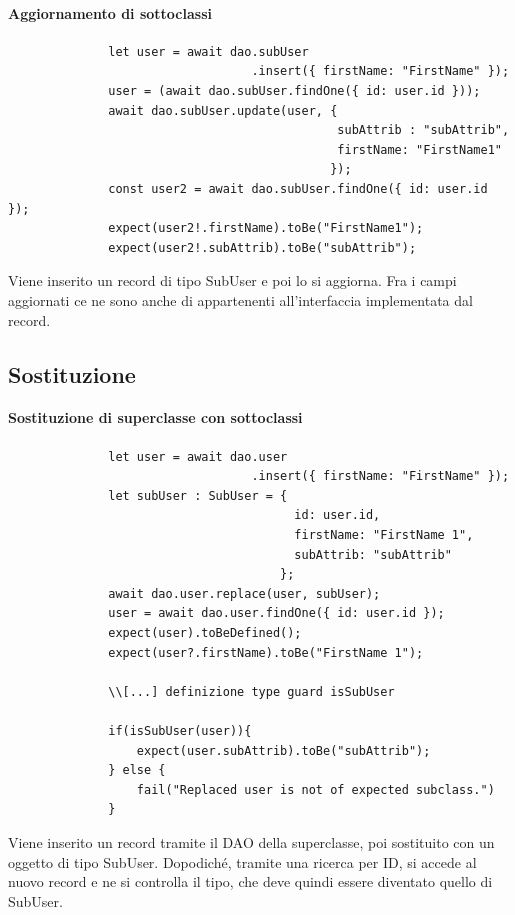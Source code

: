 \documentclass[a4paper, 12pt]{report}
\begin{document}
          \paragraph{Aggiornamento di sottoclassi}
            \begin{Verbatim}
              let user = await dao.subUser
                                  .insert({ firstName: "FirstName" });
              user = (await dao.subUser.findOne({ id: user.id }));
              await dao.subUser.update(user, { 
                                              subAttrib : "subAttrib",
                                              firstName: "FirstName1"
                                             });
              const user2 = await dao.subUser.findOne({ id: user.id });
              expect(user2!.firstName).toBe("FirstName1");
              expect(user2!.subAttrib).toBe("subAttrib");
            \end{Verbatim}
            Viene inserito un record di tipo SubUser e poi lo si aggiorna.
            Fra i campi aggiornati ce ne sono anche di appartenenti all'interfaccia implementata dal record.
        \subsection{Sostituzione}
          \paragraph{Sostituzione di superclasse con sottoclassi}
            \begin{Verbatim}
              let user = await dao.user
                                  .insert({ firstName: "FirstName" });
              let subUser : SubUser = { 
                                        id: user.id,
                                        firstName: "FirstName 1",
                                        subAttrib: "subAttrib"
                                      };
              await dao.user.replace(user, subUser);
              user = await dao.user.findOne({ id: user.id });
              expect(user).toBeDefined();
              expect(user?.firstName).toBe("FirstName 1");

              \\[...] definizione type guard isSubUser
          
              if(isSubUser(user)){
                  expect(user.subAttrib).toBe("subAttrib");
              } else {
                  fail("Replaced user is not of expected subclass.")
              }
            \end{Verbatim}
            Viene inserito un record tramite il DAO della superclasse, poi sostituito con un oggetto di tipo SubUser.
            Dopodiché, tramite una ricerca per ID, si accede al nuovo record e ne si controlla il tipo, che deve quindi essere diventato quello di SubUser.
\end{document}
